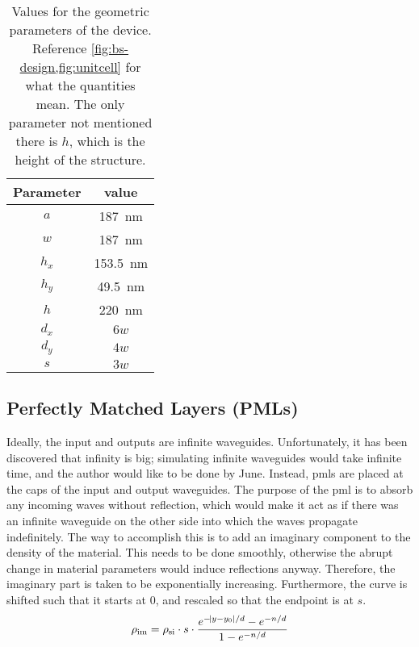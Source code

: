 \begin{table}[htpb]
	\centering
	\caption{%
		Values for the geometric parameters of the device.
		Reference \cref{fig:bs-design,fig:unitcell} for what the quantities
		mean. The only parameter not mentioned there is $h$, which is the height
		of the structure.
	}%
	\label{tab:params}

	\begin{tabular}{cc}
		\toprule
		Parameter & value\\
		\midrule
		$a$ & \qty{187}{\nm}\\
		$w$ & \qty{187}{\nm}\\
		$h_x$ & \qty{153.5}{\nm}\\
		$h_y$ & \qty{49.5}{\nm}\\
		$h$ & \qty{220}{\nm}\\
		$d_x$ & $6 w$\\
		$d_y$ & $4 w$\\
		$s$ & $3 w$\\
		\bottomrule
	\end{tabular}
\end{table}


\subsection{Perfectly Matched Layers (PMLs)}

Ideally, the input and outputs are infinite waveguides.
Unfortunately, it has been discovered that infinity is big; simulating
infinite waveguides would take infinite time, and the author would like to be done by
June.
Instead, \glspl{pml} are placed at the caps of the input and output waveguides.
The purpose of the \gls{pml} is to absorb any incoming waves without reflection,
which would make it act as if there was an infinite waveguide on the other side
into which the waves propagate indefinitely.
The way to accomplish this is to add an imaginary component to the density of
the material.
This needs to be done smoothly, otherwise the abrupt change in material
parameters would induce reflections anyway.
Therefore, the imaginary part is taken to be exponentially increasing.
Furthermore, the curve is shifted such that it starts at 0, and rescaled so that
the endpoint is at $s$.
\begin{equation}
	\rho_\text{im} = \rho_\text{si} \cdot s \cdot
	\frac{e^{-\abs{y-y_0} / d} - e^{-n/d}}{1 - e^{-n/d}}
\end{equation}

